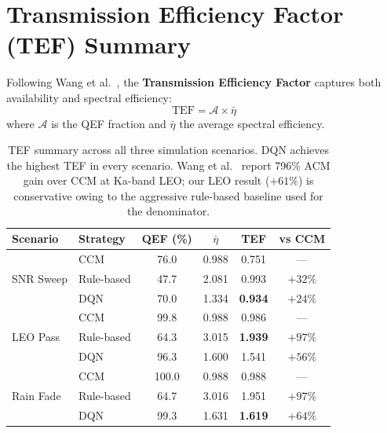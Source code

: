 \documentclass[12pt,a4paper]{report}
\begin{document}
\section{Transmission Efficiency Factor (TEF) Summary}
\label{sec:tef}

Following Wang et al.~\cite{wang2022sensors}, the \textbf{Transmission
Efficiency Factor} captures both availability and spectral efficiency:
\begin{equation}
    \text{TEF} = \mathcal{A} \times \bar{\eta}
    \label{eq:tef}
\end{equation}
where $\mathcal{A}$ is the QEF fraction and $\bar{\eta}$ the average spectral
efficiency.

\begin{table}[H]
\centering
\caption{TEF summary across all three simulation scenarios.
  DQN achieves the highest TEF in every scenario.
  Wang et al.~\cite{wang2022sensors} report 796\% ACM gain over CCM at
  Ka-band LEO; our LEO result ($+61\%$) is conservative owing to the
  aggressive rule-based baseline used for the denominator.}
\label{tab:tef}
\begin{tabular}{llcccc}
\toprule
\textbf{Scenario} & \textbf{Strategy} & \textbf{QEF (\%)} &
  \textbf{$\bar{\eta}$} & \textbf{TEF} & \textbf{vs CCM} \\
\midrule
\multirow{3}{*}{SNR Sweep}
  & CCM           & 76.0 & 0.988 & 0.751 & ---     \\
  & Rule-based    & 47.7 & 2.081 & 0.993 & $+32\%$ \\
  & DQN           & 70.0 & 1.334 & \textbf{0.934} & $+24\%$ \\
\midrule
\multirow{3}{*}{LEO Pass}
  & CCM           & 99.8 & 0.988 & 0.986 & ---      \\
  & Rule-based    & 64.3 & 3.015 & \textbf{1.939} & $+97\%$ \\
  & DQN           & 96.3 & 1.600 & 1.541 & $+56\%$ \\
\midrule
\multirow{3}{*}{Rain Fade}
  & CCM           & 100.0 & 0.988 & 0.988 & ---      \\
  & Rule-based    &  64.7 & 3.016 & 1.951 & $+97\%$ \\
  & DQN           &  99.3 & 1.631 & \textbf{1.619} & $+64\%$ \\
\bottomrule
\end{tabular}
\end{table}
\end{document}
